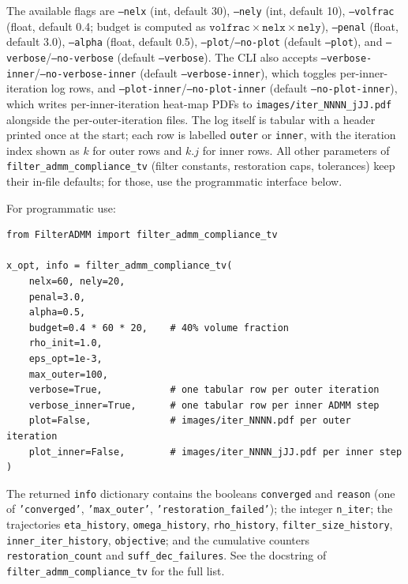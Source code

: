 \documentclass[11pt]{article}
\begin{document}
\noindent
The available flags are \texttt{--nelx} (int, default 30),
\texttt{--nely} (int, default 10),
\texttt{--volfrac} (float, default 0.4; budget is computed as
$\texttt{volfrac}\times\texttt{nelx}\times\texttt{nely}$),
\texttt{--penal} (float, default 3.0),
\texttt{--alpha} (float, default 0.5),
\texttt{--plot}/\texttt{--no-plot} (default \texttt{--plot}),
and \texttt{--verbose}/\texttt{--no-verbose} (default \texttt{--verbose}).
The CLI also accepts
\texttt{--verbose-inner}/\texttt{--no-verbose-inner} (default
\texttt{--verbose-inner}), which toggles per-inner-iteration log rows, and
\texttt{--plot-inner}/\texttt{--no-plot-inner} (default
\texttt{--no-plot-inner}), which writes per-inner-iteration heat-map PDFs to
\texttt{images/iter\_NNNN\_jJJ.pdf} alongside the per-outer-iteration files.
The log itself is tabular with a header printed once at the start; each row
is labelled \texttt{outer} or \texttt{inner}, with the iteration index shown
as $k$ for outer rows and $k.j$ for inner rows.
All other parameters of \texttt{filter\_admm\_compliance\_tv} (filter
constants, restoration caps, tolerances) keep their in-file defaults; for
those, use the programmatic interface below.

For programmatic use:

\begin{verbatim}
from FilterADMM import filter_admm_compliance_tv

x_opt, info = filter_admm_compliance_tv(
    nelx=60, nely=20,
    penal=3.0,
    alpha=0.5,
    budget=0.4 * 60 * 20,    # 40% volume fraction
    rho_init=1.0,
    eps_opt=1e-3,
    max_outer=100,
    verbose=True,            # one tabular row per outer iteration
    verbose_inner=True,      # one tabular row per inner ADMM step
    plot=False,              # images/iter_NNNN.pdf per outer iteration
    plot_inner=False,        # images/iter_NNNN_jJJ.pdf per inner step
)
\end{verbatim}

\begin{sloppypar}
\noindent
The returned \texttt{info} dictionary contains the booleans \texttt{converged} and \texttt{reason} (one of \texttt{'converged'}, \texttt{'max\_outer'}, \texttt{'restoration\_failed'}); the integer \texttt{n\_iter}; the trajectories \texttt{eta\_history}, \texttt{omega\_history}, \texttt{rho\_history}, \texttt{filter\_size\_history}, \texttt{inner\_iter\_history}, \texttt{objective}; and the cumulative counters \texttt{restoration\_count} and \texttt{suff\_dec\_failures}. See the docstring of \texttt{filter\_admm\_compliance\_tv} for the full list.
\end{sloppypar}
\end{document}
